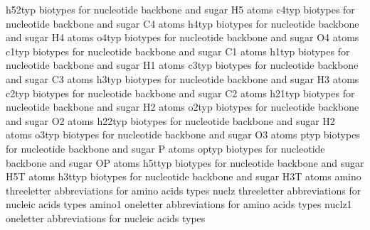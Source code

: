 \documentclass[letterpaper,11pt,english]{sphinxmanual}
\begin{document}
\begin{sphinxVerbatim}[commandchars=\\\{\}]
h52typ          biotypes for nucleotide backbone and sugar H5\PYGZsq{}\PYGZsq{} atoms
c4typ           biotypes for nucleotide backbone and sugar C4\PYGZsq{} atoms
h4typ           biotypes for nucleotide backbone and sugar H4\PYGZsq{} atoms
o4typ           biotypes for nucleotide backbone and sugar O4\PYGZsq{} atoms
c1typ           biotypes for nucleotide backbone and sugar C1\PYGZsq{} atoms
h1typ           biotypes for nucleotide backbone and sugar H1\PYGZsq{} atoms
c3typ           biotypes for nucleotide backbone and sugar C3\PYGZsq{} atoms
h3typ           biotypes for nucleotide backbone and sugar H3\PYGZsq{} atoms
c2typ           biotypes for nucleotide backbone and sugar C2\PYGZsq{} atoms
h21typ          biotypes for nucleotide backbone and sugar H2\PYGZsq{} atoms
o2typ           biotypes for nucleotide backbone and sugar O2\PYGZsq{} atoms
h22typ          biotypes for nucleotide backbone and sugar H2\PYGZsq{}\PYGZsq{} atoms
o3typ           biotypes for nucleotide backbone and sugar O3\PYGZsq{} atoms
ptyp            biotypes for nucleotide backbone and sugar P atoms
optyp           biotypes for nucleotide backbone and sugar OP atoms
h5ttyp          biotypes for nucleotide backbone and sugar H5T atoms
h3ttyp          biotypes for nucleotide backbone and sugar H3T atoms
amino           three\PYGZhy{}letter abbreviations for amino acids types
nuclz           three\PYGZhy{}letter abbreviations for nucleic acids types
amino1          one\PYGZhy{}letter abbreviations for amino acids types
nuclz1          one\PYGZhy{}letter abbreviations for nucleic acids types
\end{sphinxVerbatim}

\sphinxAtStartPar
{}
\end{document}
